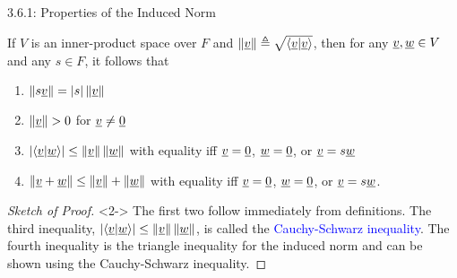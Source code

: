 \documentclass[10pt,letterpaper,english]{beamer}
\begin{document}
\begin{frame}{3.6.1: Properties of the Induced Norm}

\begin{theorem}
If $V$ is an inner-product space over $F$ and $\| \underline{v} \| \triangleq \sqrt{\left\langle \underline{v} | \underline{v} \right\rangle}$, then for any $\underline{v}, \underline{w} \in V$ and any $s\in F$, it follows that
\begin{enumerate}
\item $\left\| s \underline{v} \right\| = |s| \left\| \underline{v} \right\|$
\item $\left\| \underline{v} \right\| > 0$ for $\underline{v} \neq \underline{0}$
\item $\left| \left\langle \underline{v} | \underline{w} \right\rangle \right| \leq \left\| \underline{v} \right\| \left\| \underline{w} \right\|$ with equality iff $\underline{v} = \underline{0}$, $\underline{w}=\underline{0}$, or $\underline{v} = s \underline{w}$
\item $\left\| \underline{v} + \underline{w} \right\| \leq \left\| \underline{v} \right\| + \left\| \underline{w} \right\|$ with equality iff $\underline{v} = \underline{0}$, $\underline{w}=\underline{0}$, or $\underline{v} = s \underline{w}$.
\end{enumerate}
\end{theorem}

\begin{proof}[Sketch of Proof]<2->
The first two follow immediately from definitions.
The third inequality, $\left| \left\langle \underline{v} | \underline{w} \right\rangle \right| \leq \left\| \underline{v} \right\| \left\| \underline{w} \right\|$, is called the \textcolor{blue}{Cauchy-Schwarz inequality}.
The fourth inequality is the triangle inequality for the induced norm and can be shown using the Cauchy-Schwarz inequality.
\end{proof}


\end{frame}
\end{document}
